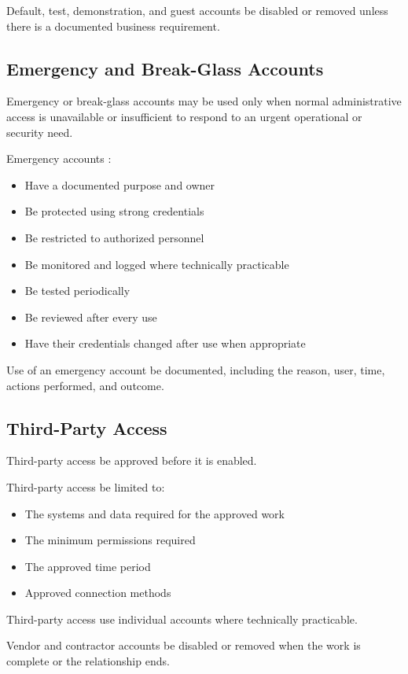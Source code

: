 Default, test, demonstration, and guest accounts \must{} be disabled or removed unless there is a documented business requirement.

\subsection{Emergency and Break-Glass Accounts}

Emergency or break-glass accounts may be used only when normal administrative access is unavailable or insufficient to respond to an urgent operational or security need.

Emergency accounts \must{}:
\begin{itemize}
    \item Have a documented purpose and owner
    \item Be protected using strong credentials
    \item Be restricted to authorized personnel
    \item Be monitored and logged where technically practicable
    \item Be tested periodically
    \item Be reviewed after every use
    \item Have their credentials changed after use when appropriate
\end{itemize}

Use of an emergency account \must{} be documented, including the reason, user, time, actions performed, and outcome.

\subsection{Third-Party Access}

Third-party access \must{} be approved before it is enabled.

Third-party access \must{} be limited to:
\begin{itemize}
    \item The systems and data required for the approved work
    \item The minimum permissions required
    \item The approved time period
    \item Approved connection methods
\end{itemize}

Third-party access \must{} use individual accounts where technically practicable.

Vendor and contractor accounts \must{} be disabled or removed when the work is complete or the relationship ends.

